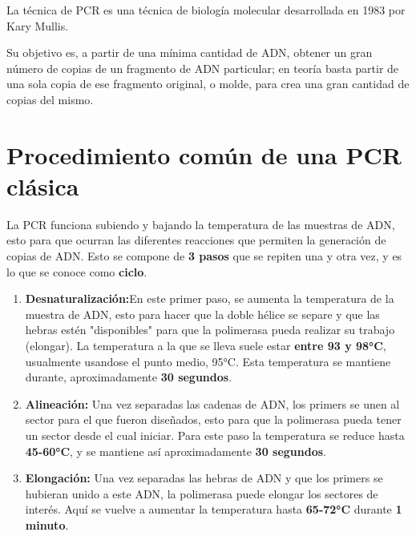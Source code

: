 
La técnica de PCR es una técnica de biología molecular desarrollada en 1983 por Kary Mullis.

Su objetivo es, a partir de una mínima cantidad de ADN, obtener un gran número de copias de un fragmento de ADN particular; en teoría basta partir de una sola copia de ese fragmento original, o molde, para crea una gran cantidad de copias del mismo.


\section{Procedimiento común de una PCR clásica}

La PCR funciona subiendo y bajando la temperatura de las muestras de ADN, esto para que ocurran las diferentes reacciones que permiten la generación de copias de ADN. Esto se compone de \textbf{3 pasos} que se repiten una y otra vez, y es lo que se conoce como \textbf{ciclo}.


\begin{enumerate}
    \item \textbf{Desnaturalización:}En este primer paso, se aumenta la temperatura de la muestra de ADN, esto para hacer que la doble hélice se separe y que las hebras estén "disponibles" para que la polimerasa pueda realizar  su trabajo (elongar). La temperatura a la que se lleva suele estar \textbf{entre 93 y 98°C}, usualmente usandose el punto medio, 95°C. Esta temperatura se mantiene durante, aproximadamente \textbf{30 segundos}. 
    \item \textbf{Alineación:} Una vez separadas las cadenas de ADN, los primers se unen al sector para el que fueron diseñados, esto para que la polimerasa pueda tener un sector desde el cual iniciar. Para este paso la temperatura se reduce hasta \textbf{45-60°C}, y se mantiene así aproximadamente \textbf{30 segundos}.
    \item \textbf{Elongación:} Una vez separadas las hebras de ADN y que los primers se hubieran unido a este ADN, la polimerasa puede elongar los sectores de interés. Aquí se vuelve a aumentar la temperatura hasta \textbf{65-72°C} durante \textbf{1 minuto}.
\end{enumerate}

